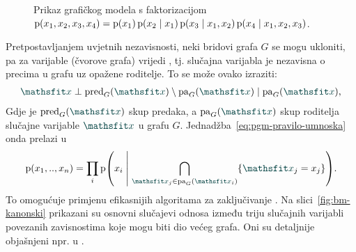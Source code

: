 \documentclass[utf8, diplomski, lmodern]{fer}
\begin{document}
\begin{figure}
	\centering
	\caption{Prikaz grafičkog modela s faktorizacijom $\operatorname*{\mathrm{p}}(x_1,x_2,x_3,x_4)=\operatorname*{\mathrm{p}}(x_1)\operatorname*{\mathrm{p}}(x_2\mid x_1)\operatorname*{\mathrm{p}}(x_3\mid x_1,x_2)\operatorname*{\mathrm{p}}(x_4\mid x_1,x_2,x_3)$.}
	\label{fig:bayesova-mreza}
\end{figure}
Pretpostavljanjem uvjetnih nezavisnosti, neki bridovi grafa $G$ se mogu ukloniti, pa za varijable (čvorove grafa) vrijedi , tj. slučajna varijabla je nezavisna o precima u grafu uz opažene roditelje. To se može ovako izraziti:
\begin{align}
\rvar x\perp \pred_G(\rvar x) \setminus \pa_G(\rvar x) \mid \pa_G(\rvar x) \text{,}
\end{align}
Gdje je $\pred_G(\rvar x)$ skup predaka, a $\pa_G(\rvar x)$ skup roditelja slučajne varijable $\rvar x$ u grafu $G$.
Jednadžba~\eqref{eq:pgm-pravilo-umnoska} onda prelazi u 
\begin{align}
\p(x_1,..,x_n) 
= \prod_i\p\del{x_i \midmid \bigcap_{\rvar x_j\in\pa_G(\rvar x_i)}\cbr{\rvar x_j=x_j}} \text{.}
\end{align} 
To omogućuje primjenu efikasnijih algoritama za zaključivanje \citep{Murphy:2012:MLPP}.
Na slici~\ref{fig:bm-kanonski} prikazani su osnovni slučajevi odnosa između triju slučajnih varijabli povezanih zavisnostima koje mogu biti dio većeg grafa. Oni su detaljnije objašnjeni npr. u \citet{Bishop:2006:PRML,Alpaydin:2014:IML}. 
\end{document}
